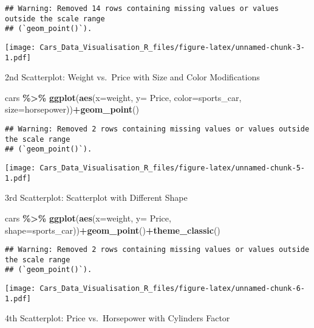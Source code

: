 \documentclass[
]{article}
\newenvironment{Shaded}{\begin{snugshade}}{\end{snugshade}}
\newcommand{\AttributeTok}[1]{\textcolor[rgb]{0.13,0.29,0.53}{#1}}
\newcommand{\FunctionTok}[1]{\textcolor[rgb]{0.13,0.29,0.53}{\textbf{#1}}}
\newcommand{\NormalTok}[1]{#1}
\newcommand{\SpecialCharTok}[1]{\textcolor[rgb]{0.81,0.36,0.00}{\textbf{#1}}}
\begin{document}
\begin{verbatim}
## Warning: Removed 14 rows containing missing values or values outside the scale range
## (`geom_point()`).
\end{verbatim}

\texttt{[image: Cars\_Data\_Visualisation\_R\_files/figure-latex/unnamed-chunk-3-1.pdf]}

2nd Scatterplot: Weight vs.~Price with Size and Color Modifications

\begin{Shaded}
\begin{Highlighting}[]
\NormalTok{cars }\SpecialCharTok{\%\textgreater{}\%} \FunctionTok{ggplot}\NormalTok{(}\FunctionTok{aes}\NormalTok{(}\AttributeTok{x=}\NormalTok{weight, }\AttributeTok{y=}\NormalTok{ Price, }\AttributeTok{color=}\NormalTok{sports\_car, }\AttributeTok{size=}\NormalTok{horsepower))}\SpecialCharTok{+}\FunctionTok{geom\_point}\NormalTok{()}
\end{Highlighting}
\end{Shaded}

\begin{verbatim}
## Warning: Removed 2 rows containing missing values or values outside the scale range
## (`geom_point()`).
\end{verbatim}

\texttt{[image: Cars\_Data\_Visualisation\_R\_files/figure-latex/unnamed-chunk-5-1.pdf]}

3rd Scatterplot: Scatterplot with Different Shape

\begin{Shaded}
\begin{Highlighting}[]
\NormalTok{cars }\SpecialCharTok{\%\textgreater{}\%} \FunctionTok{ggplot}\NormalTok{(}\FunctionTok{aes}\NormalTok{(}\AttributeTok{x=}\NormalTok{weight, }\AttributeTok{y=}\NormalTok{ Price, }\AttributeTok{shape=}\NormalTok{sports\_car))}\SpecialCharTok{+}\FunctionTok{geom\_point}\NormalTok{()}\SpecialCharTok{+}\FunctionTok{theme\_classic}\NormalTok{()}
\end{Highlighting}
\end{Shaded}

\begin{verbatim}
## Warning: Removed 2 rows containing missing values or values outside the scale range
## (`geom_point()`).
\end{verbatim}

\texttt{[image: Cars\_Data\_Visualisation\_R\_files/figure-latex/unnamed-chunk-6-1.pdf]}

4th Scatterplot: Price vs.~Horsepower with Cylinders Factor
\end{document}
